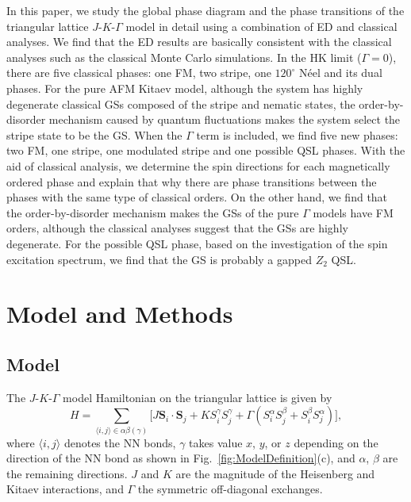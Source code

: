\documentclass[aps,prb,reprint,amsfonts,amsmath,amssymb,showpacs,groupedaddress,superscriptaddress]{revtex4-1}
\begin{document}
In this paper, we study the global phase diagram and the phase transitions of the triangular lattice $J$-$K$-$\Gamma$ model in detail using a combination of ED and classical analyses. We find that the ED results are basically consistent with the classical analyses such as the classical Monte Carlo simulations. In the HK limit ($\Gamma=0$), there are five classical phases: one FM, two stripe, one $120^{\circ}$ N\'{e}el and its dual phases. For the pure AFM Kitaev model, although the system has highly degenerate classical GSs composed of the stripe and nematic states, the order-by-disorder mechanism caused by quantum fluctuations makes the system select the stripe state to be the GS. When the $\Gamma$ term is included, we find five new phases: two FM, one stripe, one modulated stripe and one possible QSL phases. With the aid of classical analysis, we determine the spin directions for each magnetically ordered phase and explain that why there are phase transitions between the phases with the same type of classical orders. On the other hand, we find that the order-by-disorder mechanism makes the GSs of the pure $\Gamma$ models have FM orders, although the classical analyses suggest that the GSs are highly degenerate. For the possible QSL phase, based on the investigation of the spin excitation spectrum, we find that the GS is probably a gapped $Z_{2}$ QSL.


\section{Model and Methods}

\subsection{\label{sec:Model}Model}

The $J$-$K$-$\Gamma$ model Hamiltonian on the triangular lattice is given by
\begin{equation}
    H = \sum_{\langle i,j \rangle \in \alpha \beta (\gamma)} \lbrack J \bm{S}_i \cdot \bm{S}_j + K S_i^{\gamma} S_j^{\gamma} + \Gamma (S_i^{\alpha} S_j^{\beta} + S_i^{\beta} S_j^{\alpha}) \rbrack,
    \label{eq:Hamiltonian}
\end{equation}
where $\langle i,j \rangle$ denotes the NN bonds, $\gamma$ takes value $x$, $y$, or $z$ depending on the direction of the NN bond as shown in Fig.~\ref{fig:ModelDefinition}(c), and $\alpha$, $\beta$ are the remaining directions. $J$ and $K$ are the magnitude of the Heisenberg and Kitaev interactions, and $\Gamma$ the symmetric off-diagonal exchanges.
\end{document}
